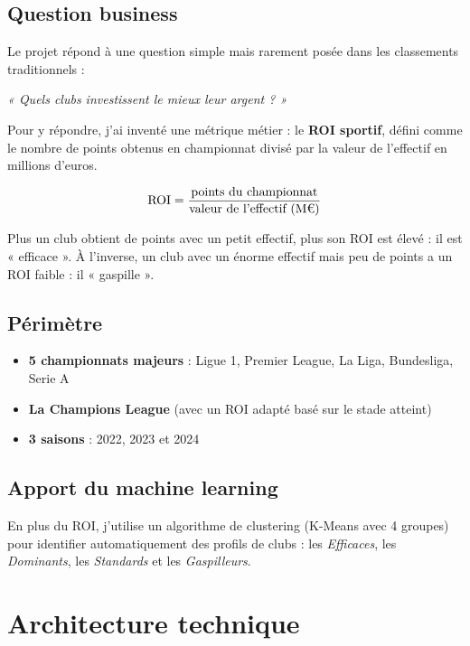 \documentclass[11pt,a4paper]{article}
\begin{document}
\subsection*{Question business}

Le projet répond à une question simple mais rarement posée dans les classements
traditionnels :

\begin{center}
\textit{« Quels clubs investissent le mieux leur argent ? »}
\end{center}

Pour y répondre, j'ai inventé une métrique métier : le \textbf{ROI sportif},
défini comme le nombre de points obtenus en championnat divisé par la valeur de
l'effectif en millions d'euros.

\[
\text{ROI} = \frac{\text{points du championnat}}{\text{valeur de l'effectif (M\texteuro)}}
\]

Plus un club obtient de points avec un petit effectif, plus son ROI est élevé :
il est « efficace ». À l'inverse, un club avec un énorme effectif mais peu de
points a un ROI faible : il « gaspille ».

\subsection*{Périmètre}

\begin{itemize}
  \item \textbf{5 championnats majeurs} : Ligue 1, Premier League, La Liga, Bundesliga, Serie A
  \item \textbf{La Champions League} (avec un ROI adapté basé sur le stade atteint)
  \item \textbf{3 saisons} : 2022, 2023 et 2024
\end{itemize}

\subsection*{Apport du machine learning}

En plus du ROI, j'utilise un algorithme de clustering (K-Means avec 4 groupes)
pour identifier automatiquement des profils de clubs : les \textit{Efficaces},
les \textit{Dominants}, les \textit{Standards} et les \textit{Gaspilleurs}.

\section{Architecture technique}
\end{document}
